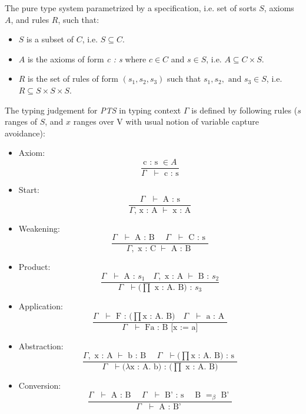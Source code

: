 \noindent
The pure type system parametrized by a specification, i.e. 
set of sorts $S$, axioms $A$, and rules $R$, such that: 

 \begin{itemize}
	\item $S$ is a subset of  $C$, i.e.  $S \subseteq C$. 
	\item $A$ is the axioms of form \textit{c : s} where $c \in C$ and $s \in S$, i.e.  $A \subseteq C \times S$. 
	\item $R$ is the set of rules of form $(s_{1}, s_{2}, s_{3})$ such that $s_{1}, s_{2}, \text{ and } s_{3} \in S$, i.e.
	 $R \subseteq S \times S \times S$.
 
 \end{itemize}
 
\noindent 
The typing judgement for \textit{PTS} in typing context $\Gamma$ is defined by following rules ($s$ ranges of $S$, and $x$ ranges over V 
 with usual notion of  variable capture avoidance):
 \begin{itemize}
 \item Axiom: \[ \frac{\text{c : s } \in A}{\Gamma \text{  } \vdash \text{ c : s}} \]
 \item Start: \[ \frac{\Gamma \text{  } \vdash \text{ A : s}}{\Gamma \text{, x : A }\vdash \text{ x : A}} \]
 \item Weakening: \[ \frac{\Gamma \text{ } \vdash \text{ A : B } \quad \Gamma \text{ } \vdash \text{ C : s }}{\Gamma, \text{ x : C } \vdash \text{ A : B }} \]
 \item Product: \[ \frac{\Gamma \text{ } \vdash \text{ A : }s_{1} \quad \Gamma, \text{ x : A } \vdash \text{ B : }s_{2}}{\Gamma \text{ } \vdash (\prod \text{ x : A. B) : }s_{3}} \]
 \item Application: \[ \frac{\Gamma \text{ }\vdash \text{ F : (}\prod \text{x : A. B)} \quad \Gamma \text{ }\vdash \text{ a : A }}{\Gamma \text{ }\vdash \text{ Fa : B [x := a]}} \]
 \item Abstraction: \[ \frac{\Gamma, \text{ x : A }\vdash \text{ b : B } \quad \Gamma \text{ }\vdash (\prod \text{x : A. B) : s }}{\Gamma \text{ }\vdash (\lambda \text{x : A. b) : (}\prod \text{ x : A. B)}} \]
 \item Conversion: \[ \frac{\Gamma \text{ }\vdash \text{ A : B } \quad \Gamma \text{ }\vdash \text{ B' : s } \quad \text{B  }=_{\beta} \text{ B' }}{\Gamma \text{ } \vdash \text{ A : B' }} \]
\end{itemize}   



